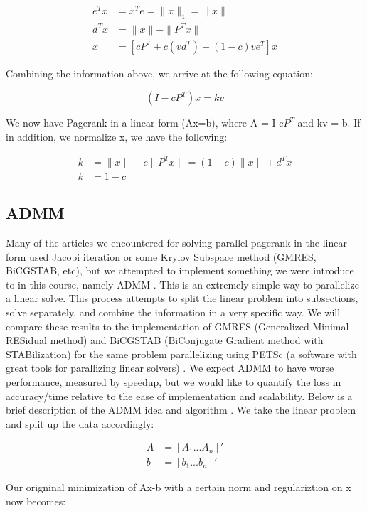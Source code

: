 \documentclass[letterpaper,12pt,onecolumn]{article}
\begin{document}
\begin{center}
\begin{align}
  e^{T}x & = x^{T}e = \|x\|_{1} = \|x\| \\
  d^{T}x &= \| x\| - \| P^{T}x\| \\
  x &= [cP^{T} + c(vd^{T}) + (1-c)ve^{T}]x
\end{align}
\end{center}

Combining the information above, we arrive at the following equation:

\begin{center}
\begin{equation}
  (I-cP^{T})x = kv
\end{equation}
\end{center}
We now have Pagerank in a linear form (Ax=b), where A = I-c$P^{T}$ and kv = b. If in addition, we normalize x, we have the following:

\begin{center}
  \begin{align}
	k &= \|x\| - c \|P^{T}x\| = (1-c) \|x\| + d^{T}x \\	
	k &= 1-c 
  \end{align}
\end{center}



\subsection{ADMM}

Many of the articles we encountered for solving parallel pagerank in the linear form used Jacobi iteration or some Krylov Subspace method (GMRES, BiCGSTAB, etc), but we attempted to implement something we were introduce to in this course, namely ADMM \cite{ADMM}. This is an extremely simple way to parallelize a linear solve. This process attempts to split the linear problem into subsections, solve separately, and combine the information in a very specific way. 
We will compare these results to the implementation of GMRES (Generalized Minimal RESidual method) and BiCGSTAB (BiConjugate Gradient method with STABilization) for the same problem parallelizing using PETSc (a software with great tools for parallizing linear solvers) \cite{Power Law Graphs}. We expect ADMM to have worse performance, measured by speedup, but we would like to quantify the loss in accuracy/time relative to the ease of implementation and scalability.
\newline
\linebreak
Below is a brief description of the ADMM idea and algorithm \cite{ADMM}.
\newline
We take the linear problem and split up the data accordingly:
\begin{center}
\begin{align}
	A &= \left[ A_{1} ... A_{n} \right]' \\
	b &= \left[ b_{1} ... b_{n} \right]' 
\end{align}
\end{center}
Our origninal minimization of Ax-b with a certain norm and regulariztion on x now becomes:
\end{document}
